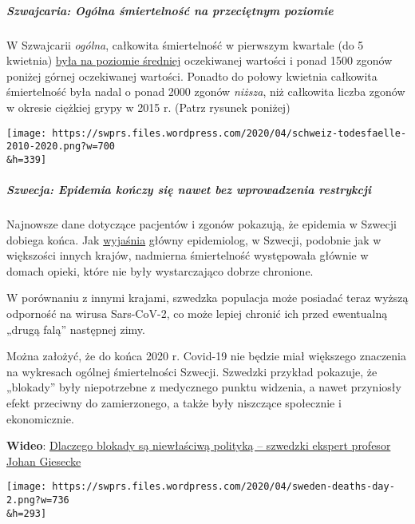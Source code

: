 \hypertarget{szwajcaria-oguxf3lna-ux15bmiertelnoux15bux107-na-przeciux119tnym-poziomie}{%
\subparagraph{\texorpdfstring{\textbf{Szwajcaria: Ogólna śmiertelność na
przeciętnym
poziomie}}{Szwajcaria: Ogólna śmiertelność na przeciętnym poziomie}}\label{szwajcaria-oguxf3lna-ux15bmiertelnoux15bux107-na-przeciux119tnym-poziomie}}

W Szwajcarii \emph{ogólna}, całkowita śmiertelność w pierwszym kwartale
(do 5 kwietnia)
\href{https://swprs.files.wordpress.com/2020/04/ch-sterblichkeit-kumuliert-q1-2020.pdf}{była
na poziomie średniej} oczekiwanej wartości i ponad 1500 zgonów poniżej
górnej oczekiwanej wartości. Ponadto do połowy kwietnia całkowita
śmiertelność była nadal o ponad 2000 zgonów \emph{niższa}, niż całkowita
liczba zgonów w okresie ciężkiej grypy w 2015 r. (Patrz rysunek poniżej)

\texttt{[image: https://swprs.files.wordpress.com/2020/04/schweiz-todesfaelle-2010-2020.png?w=700\\\&h=339]}

\hypertarget{szwecja-epidemia-koux144czy-siux119-nawet-bez-wprowadzenia-restrykcji}{%
\subparagraph{Szwecja: Epidemia kończy się nawet bez wprowadzenia
restrykcji}\label{szwecja-epidemia-koux144czy-siux119-nawet-bez-wprowadzenia-restrykcji}}

Najnowsze dane dotyczące pacjentów i zgonów pokazują, że epidemia w
Szwecji dobiega końca. Jak
\href{https://www.washingtontimes.com/news/2020/apr/15/sweden-coronavirus-rates-easing-despite-loose-rule/}{wyjaśnia}
główny epidemiolog, w Szwecji, podobnie jak w większości innych krajów,
nadmierna śmiertelność występowała głównie w domach opieki, które nie
były wystarczająco dobrze chronione.

W porównaniu z innymi krajami, szwedzka populacja może posiadać teraz
wyższą odporność na wirusa Sars-CoV-2, co może lepiej chronić ich przed
ewentualną „drugą falą'' następnej zimy.

Można założyć, że do końca 2020 r. Covid-19 nie będzie miał większego
znaczenia na wykresach ogólnej śmiertelności Szwecji. Szwedzki przykład
pokazuje, że „blokady'' były niepotrzebne z medycznego punktu widzenia,
a nawet przyniosły efekt przeciwny do zamierzonego, a także były
niszczące społecznie i ekonomicznie.

\textbf{Wideo}:
\href{https://www.youtube.com/watch?v=bfN2JWifLCY}{Dlaczego blokady są
niewłaściwą polityką -- szwedzki ekspert profesor Johan Giesecke}

\texttt{[image: https://swprs.files.wordpress.com/2020/04/sweden-deaths-day-2.png?w=736\\\&h=293]}


